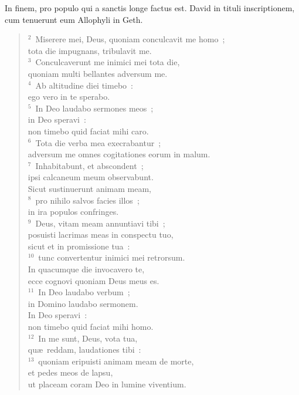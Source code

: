 \bchapter
\lettrine[lines=3,image=true,loversize=0.05,lraise=-0.03]{I}{}n finem, pro populo qui a sanctis longe factus est. David in tituli inscriptionem, cum tenuerunt eum Allophyli in Geth.
\begin{flushleft}\begin{verse}\vspace{6pt}${}^{2}$~Miserere mei, Deus, quoniam conculcavit me homo~;\\ tota die impugnans, tribulavit me.\\
${}^{3}$~Conculcaverunt me inimici mei tota die,\\ quoniam multi bellantes adversum me.\\
${}^{4}$~Ab altitudine diei timebo~:\\ ego vero in te sperabo.\\
${}^{5}$~In Deo laudabo sermones meos~;\\ in Deo speravi~:\\ non timebo quid faciat mihi caro.\\
${}^{6}$~Tota die verba mea execrabantur~;\\ adversum me omnes cogitationes eorum in malum.\\
${}^{7}$~Inhabitabunt, et abscondent~;\\ ipsi calcaneum meum observabunt.\\ Sicut sustinuerunt animam meam,\\
${}^{8}$~pro nihilo salvos facies illos~;\\ in ira populos confringes.\\
${}^{9}$~Deus, vitam meam annuntiavi tibi~;\\ posuisti lacrimas meas in conspectu tuo,\\ sicut et in promissione tua~:\\
${}^{10}$~tunc convertentur inimici mei retrorsum.\\ In quacumque die invocavero te,\\ ecce cognovi quoniam Deus meus es.\\
${}^{11}$~In Deo laudabo verbum~;\\ in Domino laudabo sermonem.\\ In Deo speravi~:\\ non timebo quid faciat mihi homo.\\
${}^{12}$~In me sunt, Deus, vota tua,\\ qu\ae\ reddam, laudationes tibi~:\\
${}^{13}$~quoniam eripuisti animam meam de morte,\\ et pedes meos de lapsu,\\ ut placeam coram Deo in lumine viventium.\end{verse}\end{flushleft}



